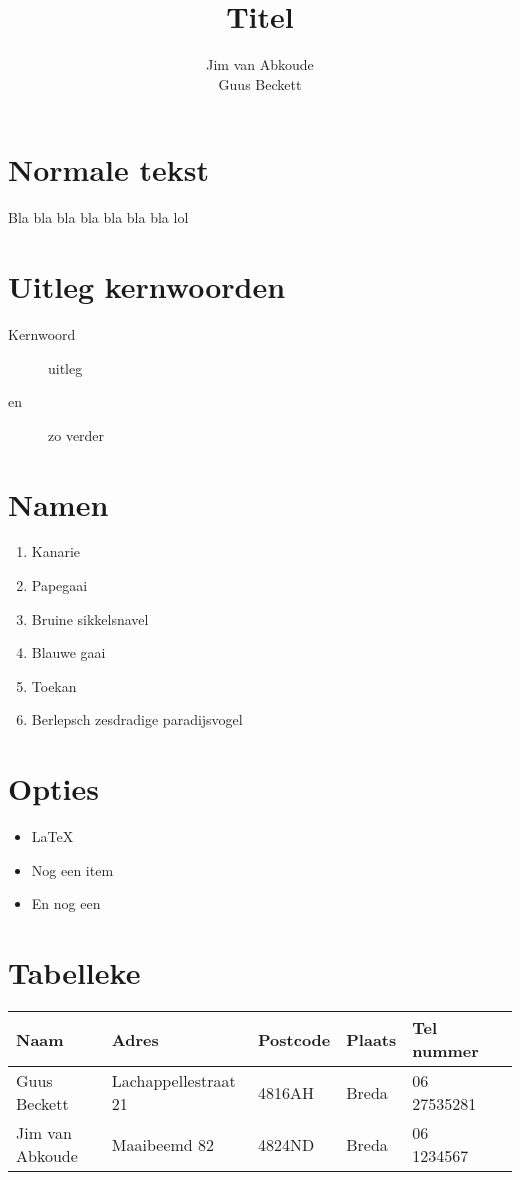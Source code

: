 


\title{Titel}
\author{Jim van Abkoude\\Guus Beckett}

\clearpage\maketitle
\thispagestyle{empty}
\newpage

\tableofcontents
\newpage

\section{Normale tekst}
Bla bla bla bla bla bla bla lol
\section{Uitleg kernwoorden}
\begin{description}
	\item[Kernwoord] uitleg
	\item[en] zo verder
\end{description}
\section{Namen}
\begin{enumerate}
	\item Kanarie
	\item Papegaai
	\item Bruine sikkelsnavel
	\item Blauwe gaai
	\item Toekan
	\item Berlepsch zesdradige paradijsvogel
\end{enumerate}
\section{Opties}
\begin{itemize}
	\item \LaTeX
	\item Nog een item
	\item En nog een
\end{itemize}
\section{Tabelleke}
\begin{center}
	\begin{tabular}{ | l | l | l | l | l | p{5cm} |}
	\hline
	Naam & Adres & Postcode & Plaats & Tel nummer\\ \hline
	Guus Beckett & Lachappellestraat 21 & 4816AH & Breda & 06 27535281 \\
	Jim van Abkoude & Maaibeemd 82 & 4824ND & Breda & 06 1234567\\ \hline
	\end{tabular}
\end{center}


